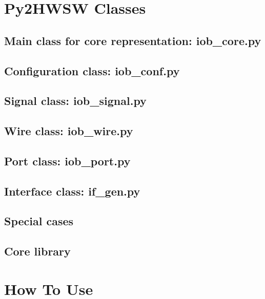 \documentclass{ug}
\begin{document}
\section{Py2HWSW Classes}
\label{sec:py_classes}

\subsection{Main class for core representation: iob\_core.py}
\label{sec:iob_core}


\subsection{Configuration class: iob\_conf.py}
\label{sec:iob_conf}


\subsection{Signal class: iob\_signal.py}
\label{sec:iob_signal}


\subsection{Wire class: iob\_wire.py}
\label{sec:iob_wire}


\subsection{Port class: iob\_port.py}
\label{sec:iob_port}


\subsection{Interface class: if\_gen.py}
\label{sec:if_gen}


\subsection{Special cases}
\label{sec:special_cases}


\subsection{Core library}
\label{sec:core_lib}


%
%
\ifdefined\SECTIONCLEARPAGE
\clearpage
\fi
\section{How To Use}
\label{sec:usage}
\end{document}
